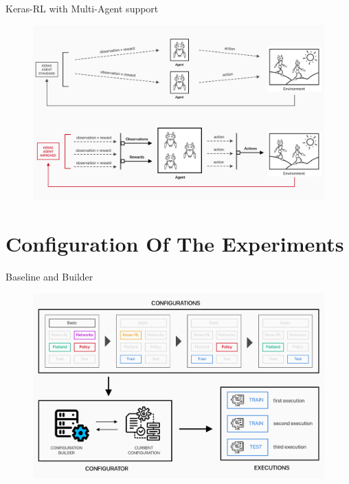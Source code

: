 \documentclass[10pt, xcolor={dvipsnames}]{beamer}
\begin{document}
\begin{frame}{Keras-RL with Multi-Agent support}
    \begin{figure}
    \centering
    \includegraphics[width=1\textwidth, height=0.65\textwidth]{assets/rl/keras.png}
    \end{figure}
\end{frame}



\section{Configuration Of The Experiments}

\begin{frame}{Baseline and Builder}
    \begin{figure}
    \centering
    \includegraphics[width=1\textwidth]{assets/configs.png}
    \end{figure}
\end{frame}
\end{document}
